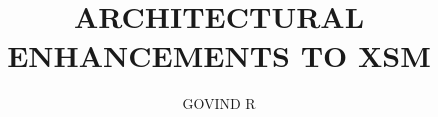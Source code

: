 \documentclass[modernstyle,12pt]{thesis}
\title{\uppercase{Architectural Enhancements to XSM}}
\author{\uppercase{Govind R     }}{\uppercase{B110041CS}}
\begin{document}





\nocite{*}      %



\appendix   %


\end{document}
